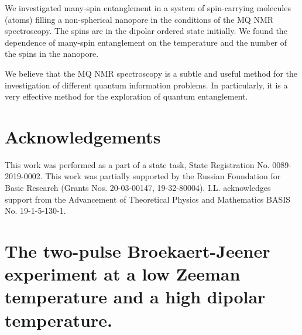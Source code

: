We investigated many-spin entanglement in a system of spin-carrying molecules (atoms) filling a non-spherical nanopore in the conditions of the MQ NMR spectroscopy. The spins are in the dipolar ordered state initially.
We found the dependence of many-spin entanglement on the temperature and the number of the spins in the nanopore.

We believe that the MQ NMR spectroscopy is a subtle and useful method for the investigation of different quantum information problems.
In particularly, it is a very effective method for the exploration of quantum entanglement.



\section{Acknowledgements}
This work was performed as a part of a state task, State Registration No. 0089-2019-0002.
This work was partially supported by the Russian Foundation for Basic Research (Grants Nos. 20-03-00147, 19-32-80004).
I.L. acknowledges support from the Advancement of Theoretical Physics and Mathematics BASIS No. 19-1-5-130-1.



\appendix
\section{The two-pulse Broekaert-Jeener experiment at a low Zeeman temperature and a high dipolar temperature.}

